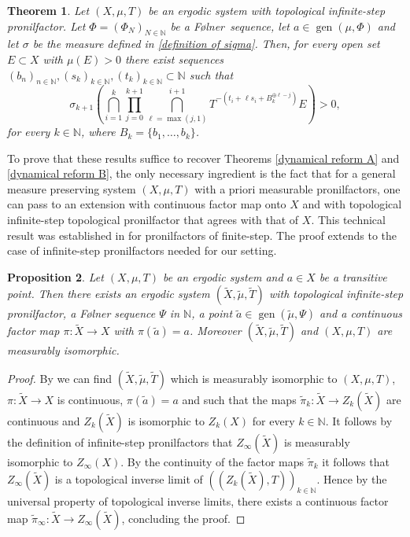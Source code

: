 \documentclass[letter, 11pt]{article}
\newcommand{\Folner}{F\o{}lner}
\newtheorem{theo}{Theorem}[section]
\newtheorem{prop}[theo]{Proposition}
\theoremstyle{definition}
\theoremstyle{plain}
\newcommand{\N}{\mathbb{N}}
\DeclareMathOperator\gen{gen}
\newcommand{\1}{\mathbbm{1}}
\begin{document}
\begin{theo}\label{topological pronilfactors 1}
Let $(X,\mu,T)$ be an ergodic system with topological infinite-step 
pronilfactor. Let $\Phi=(\Phi_N)_{N\in \N}$ be a \Folner\ sequence, 
let 
$a\in \gen(\mu,\Phi)$ and let $\sigma$ be the measure defined in \cref{definition of sigma}. Then, 
for every open set $E\subset X$ with $\mu(E)>0$ there exist 
sequences $(b_n)_{n\in \N}, (s_k)_{k\in \N}, (t_k)_{k\in \N}\subset \N$ such 
that 
 $$
\sigma_{k+1}\left(\bigcap_{i=1}^k  \prod_{j=0}^{k+1}  \bigcap_{\ell=\max(j,1)}^{i+1}  T^{-\left( t_i+\ell s_i+ B_{k}^{\oplus \ell-j} \right)}  E   \right)>0,$$
for every $k\in \N$, where $B_k=\{b_1,\ldots,b_{k}\}$.
\end{theo}
To prove that these results suffice to recover Theorems \ref{dynamical reform A} and \ref{dynamical reform B}, the only necessary 
ingredient is the fact that for a general measure 
preserving system $(X,\mu,T)$ with a priori measurable pronilfactors, one can 
pass to an extension with continuous factor map onto $X$ and with topological infinite-step topological pronilfactor that agrees with that of $X$. This technical result was established in \cite[Proposition $5.7$ and Lemma $5.8$]{Kra_Moreira_Richter_Robertson:2022} for pronilfactors of finite-step. The proof extends to the case of infinite-step pronilfactors needed for our setting.

\begin{prop}\label{reduction to topological pronilfactors is possible}
Let $(X, \mu,T)$ be an ergodic system and  $a \in X$ be a transitive point. Then there exists an ergodic system $(\tilde{X}, \tilde \mu, \tilde T)$ with topological infinite-step pronilfactor, a F\o lner sequence $\Psi$ in $\N$, a point $\tilde a \in \gen(\tilde \mu, \Psi)$ and a continuous factor map $\pi \colon \tilde X \to X$ with $\pi(\tilde a) = a$. Moreover $(\tilde{X}, \tilde \mu, \tilde T)$ and $(X, \mu,T)$ are measurably isomorphic. 
\end{prop}

\begin{proof}
    By \cite[Lemma 5.7]{Kra_Moreira_Richter_Robertson:2022} we can find $(\tilde{X}, \tilde \mu, \tilde T)$ which is measurably isomorphic to $(X, \mu,T)$, $\pi \colon \tilde X \to X$ is continuous, $\pi(\tilde a) = a$ and such that the maps $\tilde \pi_k \colon \tilde X \to Z_{k}(\tilde X)$ are continuous and $Z_{k}(\tilde X)$ is isomorphic to $Z_{k}(X)$ for every $k\in \N$. It follows by the definition of infinite-step pronilfactors that
    $Z_{\infty}(\tilde X)$ is measurably isomorphic to $Z_{\infty}(X)$. By the continuity of the factor maps $\tilde{\pi}_k$ it follows that $Z_{\infty}(\tilde X)$ is a topological inverse limit of $((Z_{k}(\tilde X),T))_{k\in \N}$. Hence by the universal property of topological inverse limits, there exists a continuous factor map $\tilde \pi_{\infty} \colon \tilde X \to Z_{\infty}(\tilde X) $, concluding the proof.
\end{proof}
\end{document}
